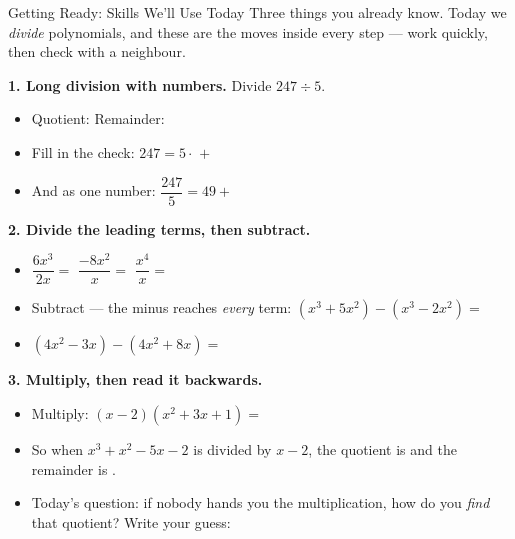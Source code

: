 \documentclass[12pt]{article}
\begin{document}

\vspace{0.10in}

\begin{notesbox}{Getting Ready: Skills We'll Use Today}
Three things you already know. Today we \emph{divide} polynomials, and these are the moves
inside every step --- work quickly, then check with a neighbour.

\vspace{6pt}
\textbf{1. Long division with numbers.} Divide $247 \div 5$.
\begin{itemize}[leftmargin=1.6em, itemsep=6pt]
  \item Quotient:  \qquad Remainder: 
  \item Fill in the check: \; $247 = 5 \cdot$  $+$ 
  \item And as one number: \; $\dfrac{247}{5} = 49 + $ 
\end{itemize}

\vspace{8pt}
\textbf{2. Divide the leading terms, then subtract.}
\begin{itemize}[leftmargin=1.6em, itemsep=8pt]
  \item $\dfrac{6x^3}{2x} = $  \qquad $\dfrac{-8x^2}{x} = $ 
        \qquad $\dfrac{x^4}{x} = $ 
  \item Subtract --- the minus reaches \emph{every} term:
        \; $(x^3 + 5x^2) - (x^3 - 2x^2) = $ 
  \item $(4x^2 - 3x) - (4x^2 + 8x) = $ 
\end{itemize}

\vspace{8pt}
\textbf{3. Multiply, then read it backwards.}
\begin{itemize}[leftmargin=1.6em, itemsep=8pt]
  \item Multiply: \; $(x - 2)(x^2 + 3x + 1) = $ 
  \item So when $x^3 + x^2 - 5x - 2$ is divided by $x - 2$, the quotient is 
        and the remainder is .
  \item Today's question: if nobody hands you the multiplication, how do you \emph{find} that
        quotient? Write your guess: 
\end{itemize}
\end{notesbox}
\end{document}
